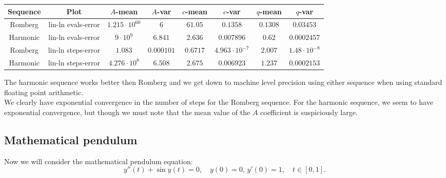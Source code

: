 \begin{table}[H]
    \centering
    \small
     \begin{tabular}{c|c||c|c|c|c|c|c}
Sequence & Plot & \(A\)-mean & \(A\)-var & \(c\)-mean & \(c\)-var & \(q\)-mean & \(q\)-var\\\hline
\rowcolor{red}
Romberg & lin-ln evals-error & \(1.215\cdot 10^{60}\) & \(6\) & \(61.05\) & \(0.1358\) & \(0.1308\) & \(0.03453\) \\
\rowcolor{yellow}
Harmonic & lin-ln evals-error & \(9\cdot 10^9\) & \(6.841\) & \(2.636\) & \(0.007896\) & \(0.62\) & \(0.0002457\) \\
\rowcolor{green}
Romberg & lin-ln steps-error & \(1.083\) & \(0.000101\) & \(0.6717\) & \(4.963\cdot 10^{-7}\) & \(2.007\) & \(1.48\cdot 10^{-8}\) \\
\rowcolor{yellow}
Harmonic & lin-ln steps-error & \(4.276\cdot 10^8\) & \(6.508\) & \(2.675\) & \(0.006923\) & \(1.237\) & \(0.0002153\) \\
    \end{tabular}
    \label{tab:my_label}
\end{table}

The harmonic sequence works better then Romberg and we get down to machine level precision using either sequence when using standard floating point arithmetic.\\

We clearly have exponential convergence in the number of steps for the Romberg sequence. For the harmonic sequence, we seem to have exponential convergence, but though we must note that the mean value of the \(A\) coefficient is suspiciously large.

\subsection{Mathematical pendulum}

Now we will consider the mathematical pendulum equation:
\begin{equation}
y''(t) + \sin y(t) = 0,\quad y(0) = 0,\, y'(0) = 1, \quad t\in [0,1].
\end{equation}

